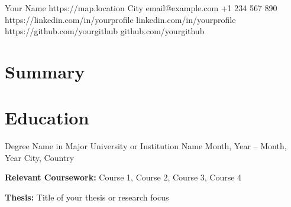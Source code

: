 \documentclass[11pt, a4paper]{article}
\begin{document}


\cvHeader
    {Your Name}
    {https://map.location}
    {City}
    {email@example.com}
    {+1 234 567 890}
    {https://linkedin.com/in/yourprofile}
    {linkedin.com/in/yourprofile}
    {https://github.com/yourgithub}
    {github.com/yourgithub}



\section{Summary}


\section{Education}
\cvEducation
    {Degree Name in Major}
    {University or Institution Name}
    {Month, Year – Month, Year}
    {City, Country}
    {
        \item \textbf{Relevant Coursework:} Course 1, Course 2, Course 3, Course 4
        \item \textbf{Thesis:} Title of your thesis or research focus
    }
\end{document}
